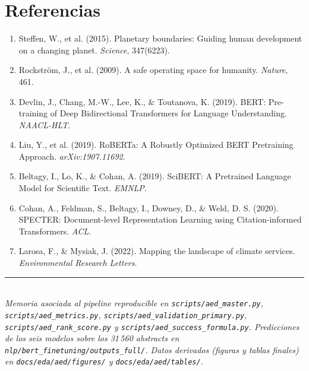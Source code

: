 \documentclass[11pt,a4paper]{article}
\begin{document}
\section*{Referencias}

\small
\begin{enumerate}
\item Steffen, W., et al. (2015). Planetary boundaries: Guiding human development on a changing planet. \emph{Science}, 347(6223).
\item Rockström, J., et al. (2009). A safe operating space for humanity. \emph{Nature}, 461.
\item Devlin, J., Chang, M.-W., Lee, K., \& Toutanova, K. (2019). BERT: Pre-training of Deep Bidirectional Transformers for Language Understanding. \emph{NAACL-HLT}.
\item Liu, Y., et al. (2019). RoBERTa: A Robustly Optimized BERT Pretraining Approach. \emph{arXiv:1907.11692}.
\item Beltagy, I., Lo, K., \& Cohan, A. (2019). SciBERT: A Pretrained Language Model for Scientific Text. \emph{EMNLP}.
\item Cohan, A., Feldman, S., Beltagy, I., Downey, D., \& Weld, D. S. (2020). SPECTER: Document-level Representation Learning using Citation-informed Transformers. \emph{ACL}.
\item Larosa, F., \& Mysiak, J. (2022). Mapping the landscape of climate services. \emph{Environmental Research Letters}.
\end{enumerate}

\vfill
\noindent\rule{\linewidth}{0.4pt}\\
\small\textit{Memoria asociada al pipeline reproducible en \texttt{scripts/aed\_master.py}, \texttt{scripts/aed\_metrics.py}, \texttt{scripts/aed\_validation\_primary.py}, \texttt{scripts/aed\_rank\_score.py} y \texttt{scripts/aed\_success\_formula.py}. Predicciones de los seis modelos sobre los 31\,560 abstracts en \texttt{nlp/bert\_finetuning/outputs\_full/}. Datos derivados (figuras y tablas finales) en \texttt{docs/eda/aed/figures/} y \texttt{docs/eda/aed/tables/}.}
\end{document}
